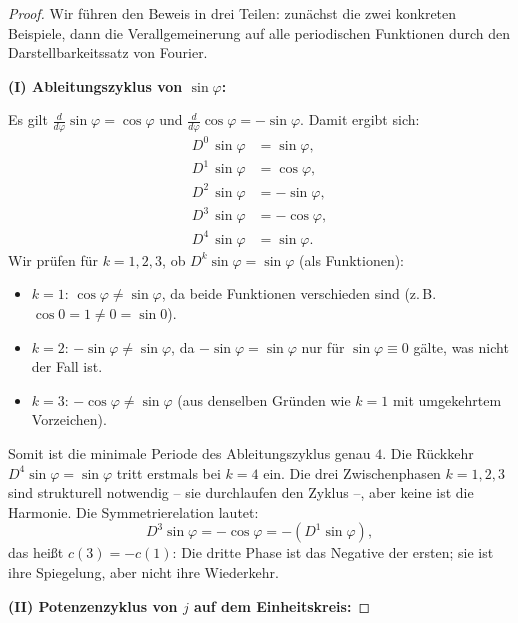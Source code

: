 ﻿\documentclass[a4paper,12pt]{article}
\theoremstyle{definition}
\begin{document}
\begin{proof}
Wir führen den Beweis in drei Teilen: zunächst die zwei konkreten Beispiele,
dann die Verallgemeinerung auf alle periodischen Funktionen durch den
Darstellbarkeitssatz von Fourier.

\medskip
\textbf{(I) Ableitungszyklus von $\sin\varphi$:}

Es gilt $\frac{d}{d\varphi}\sin\varphi = \cos\varphi$ und
$\frac{d}{d\varphi}\cos\varphi = -\sin\varphi$. Damit ergibt sich:
\begin{align*}
	D^0\,\sin\varphi &= \sin\varphi, \\
	D^1\,\sin\varphi &= \cos\varphi, \\
	D^2\,\sin\varphi &= -\sin\varphi, \\
	D^3\,\sin\varphi &= -\cos\varphi, \\
	D^4\,\sin\varphi &= \sin\varphi.
\end{align*}
Wir prüfen für $k = 1, 2, 3$, ob $D^k\sin\varphi = \sin\varphi$ (als Funktionen):
\begin{itemize}
	\item $k=1$: $\cos\varphi \neq \sin\varphi$, da beide Funktionen verschieden sind
	      (z.\,B.\ $\cos 0 = 1 \neq 0 = \sin 0$).
	\item $k=2$: $-\sin\varphi \neq \sin\varphi$, da $-\sin\varphi = \sin\varphi$
	      nur für $\sin\varphi \equiv 0$ gälte, was nicht der Fall ist.
	\item $k=3$: $-\cos\varphi \neq \sin\varphi$ (aus denselben Gründen wie $k=1$
	      mit umgekehrtem Vorzeichen).
\end{itemize}
Somit ist die minimale Periode des Ableitungszyklus genau $4$. Die Rückkehr
$D^4\sin\varphi = \sin\varphi$ tritt erstmals bei $k=4$ ein. Die drei
Zwischenphasen $k=1,2,3$ sind strukturell notwendig -- sie durchlaufen den Zyklus --, 
aber keine ist die Harmonie. Die Symmetrierelation lautet:
\[
	D^3\sin\varphi = -\cos\varphi = -(D^1\sin\varphi),
\]
das heißt $c(3) = -c(1)$: Die dritte Phase ist das Negative der ersten;
sie ist ihre Spiegelung, aber nicht ihre Wiederkehr.

\medskip
\textbf{(II) Potenzenzyklus von $j$ auf dem Einheitskreis:}


\end{proof}
\end{document}
